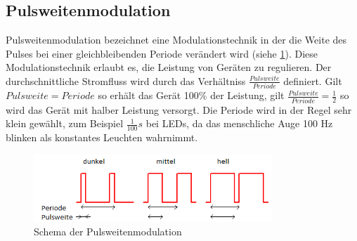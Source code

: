 \subsection{Pulsweitenmodulation}\label{sec_pulsweitenmodulation}
Pulsweitenmodulation bezeichnet eine Modulationstechnik in der die Weite des
Pulses bei einer gleichbleibenden Periode verändert wird (siehe \ref{pwm_schma}).
Diese Modulationstechnik erlaubt es, die Leistung von Geräten zu regulieren.
Der durchschnittliche Stromfluss wird durch das Verhältniss
$\frac{Pulsweite}{Periode}$ definiert. Gilt $Pulsweite=Periode$ so erhält das
Gerät 100\% der Leistung, gilt $\frac{Pulsweite}{Periode}=\frac{1}{2}$ so wird das Gerät mit halber Leistung
versorgt.
Die Periode wird in der Regel sehr klein gewählt, zum Beispiel $\frac{1}{100}s$
bei LEDs, da das menschliche Auge 100 Hz blinken als konstantes Leuchten
wahrnimmt.
\begin{figure}[h]
  \begin{center}
    \includegraphics[width=0.8\textwidth]{skizzen/pwm.png}
  \end{center}
  \caption{Schema der Pulsweitenmodulation}
  \label{pwm_schma}
\end{figure}


